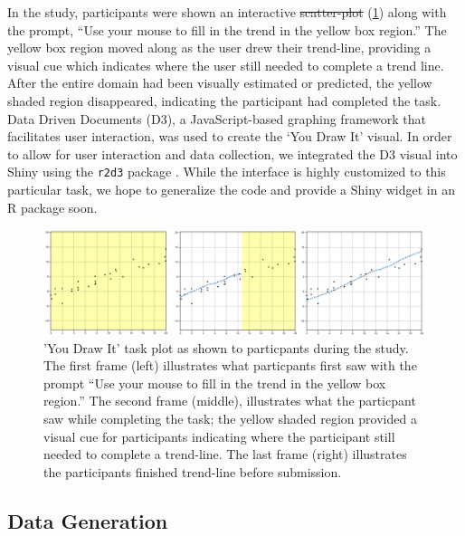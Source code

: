 \documentclass[12pt]{article}
\providecommand{\DIFaddtex}[1]{{\protect\color{blue}\uwave{#1}}} %
\providecommand{\DIFdeltex}[1]{{\protect\color{red}\sout{#1}}}                      %
\providecommand{\DIFaddbegin}{} %
\providecommand{\DIFaddend}{} %
\providecommand{\DIFdelbegin}{} %
\providecommand{\DIFdelend}{} %
\providecommand{\DIFadd}[1]{\texorpdfstring{\DIFaddtex{#1}}{#1}} %
\providecommand{\DIFdel}[1]{\texorpdfstring{\DIFdeltex{#1}}{}} %
\newcommand{\DIFscaledelfig}{0.5}
\newlength{\DIFdelgraphicswidth} %
\newlength{\DIFdelgraphicsheight} %
\newcommand{\DIFaddincludegraphics}[2][]{{\color{blue}\fbox{\DIFOincludegraphics[#1]{#2}}}} %
\newcommand{\DIFdelincludegraphics}[2][]{%
\sbox{\DIFdelgraphicsbox}{\DIFOincludegraphics[#1]{#2}}%
\settoboxwidth{\DIFdelgraphicswidth}{\DIFdelgraphicsbox} %
\settoboxtotalheight{\DIFdelgraphicsheight}{\DIFdelgraphicsbox} %
\scalebox{\DIFscaledelfig}{%
\parbox[b]{\DIFdelgraphicswidth}{\usebox{\DIFdelgraphicsbox}\\[-\baselineskip] \rule{\DIFdelgraphicswidth}{0em}}\llap{\resizebox{\DIFdelgraphicswidth}{\DIFdelgraphicsheight}{%
\setlength{\unitlength}{\DIFdelgraphicswidth}%
\begin{picture}(1,1)%
\thicklines\linethickness{2pt} %
{\color[rgb]{1,0,0}\put(0,0){\framebox(1,1){}}}%
{\color[rgb]{1,0,0}\put(0,0){\line( 1,1){1}}}%
{\color[rgb]{1,0,0}\put(0,1){\line(1,-1){1}}}%
\end{picture}%
}\hspace*{3pt}}} %
} %
\DeclareRobustCommand{\DIFaddbegin}{\DIFOaddbegin \let\includegraphics\DIFaddincludegraphics} %
\DeclareRobustCommand{\DIFaddend}{\DIFOaddend \let\includegraphics\DIFOincludegraphics} %
\DeclareRobustCommand{\DIFdelbegin}{\DIFOdelbegin \let\includegraphics\DIFdelincludegraphics} %
\DeclareRobustCommand{\DIFdelend}{\DIFOaddend \let\includegraphics\DIFOincludegraphics} %
\begin{document}
In the study, participants were shown an interactive \DIFdelbegin \DIFdel{scatter-plot
}\DIFdelend \DIFaddbegin \DIFadd{scatterplot
}\DIFaddend (\cref{fig:ydi-stimuli}) along with the prompt, ``Use your mouse to fill
in the trend in the yellow box region.'' The yellow box region moved
along as the user drew their trend-line, providing a visual cue which
indicates where the user still needed to complete a trend line. After
the entire domain had been visually estimated or predicted, the yellow
shaded region disappeared, indicating the participant had completed the
task. Data Driven Documents (D3), a JavaScript-based graphing framework
that facilitates user interaction, was used to create the `You Draw It'
visual. In order to allow for user interaction and data collection, we
integrated the D3 visual into Shiny using the \texttt{r2d3} package
\DIFaddbegin \DIFadd{\mbox{%
\citep{r2d3}}\hspace{0pt}%
}\DIFaddend . While the interface is highly customized to this
particular task, we hope to generalize the code and provide a Shiny
widget in an R package soon.

\begin{figure}[tbp]

{\centering \includegraphics[width=1\linewidth,]{images/ydi-stimuli} 

}

\caption{'You Draw It' task plot as shown to particpants during the study. The first frame (left) illustrates what particpants first saw with the prompt “Use your mouse to fill in the trend in the yellow box region.” The second frame (middle), illustrates what the particpant saw while completing the task; the yellow shaded region provided a visual cue for participants indicating where the participant still needed to complete a trend-line. The last frame (right) illustrates the participants finished trend-line before submission.}\label{fig:ydi-stimuli}
\end{figure}

\hypertarget{data-generation}{%
\subsection{Data Generation}\label{data-generation}}
\end{document}
